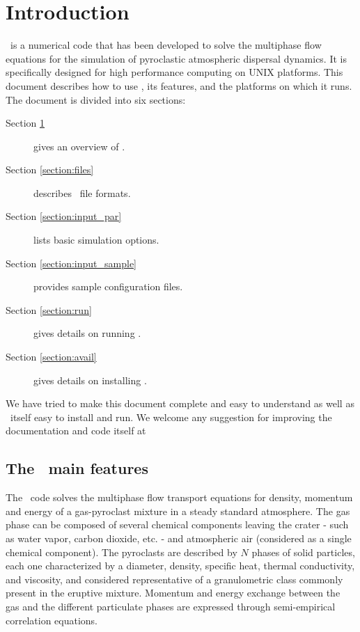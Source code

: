 \section{Introduction}
\label{section:intro}

\PDAC\ is a numerical code that has been developed to solve the multiphase
flow equations for the simulation of pyroclastic atmospheric dispersal dynamics.
It is specifically designed for high performance computing on UNIX platforms.
This document describes how to use 
\PDAC, its features, and the platforms on which it runs.
The document is divided into six sections:
\begin{description}
\item[Section \ref{section:intro}] gives an overview of \PDAC.
\item[Section \ref{section:files}] describes \PDAC\ file formats.
\item[Section \ref{section:input_par}] lists basic simulation options.
\item[Section \ref{section:input_sample}] provides sample configuration files.
\item[Section \ref{section:run}] gives details on running \PDAC.
\item[Section \ref{section:avail}] gives details on installing \PDAC.
\end{description}

We have tried to make this document complete and easy to understand as well 
as \PDAC\ itself easy to install and run.
We welcome any suggestion for improving the documentation and code itself
at \PDACADDRESS\

\subsection{The \PDAC\ main features}

The \PDAC\ code solves the multiphase flow transport equations for
density, momentum and energy of a gas-pyroclast mixture in a steady
standard atmosphere.
The gas phase can be composed of several chemical components leaving
the crater - such as water vapor, carbon dioxide, etc. - and
atmospheric air (considered as a single chemical component).
The pyroclasts are described by $N$ phases of solid particles,
each one characterized by a diameter, density, specific
heat, thermal conductivity, and viscosity, and considered
representative of a granulometric class commonly present in
the eruptive mixture. Momentum and energy exchange between the gas
and the different particulate phases are expressed through semi-empirical
correlation equations.

